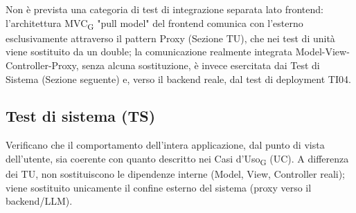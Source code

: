 Non è prevista una categoria di test di integrazione separata lato frontend: l'architettura MVC\textsubscript{G} "pull model" del frontend comunica con l'esterno esclusivamente attraverso il pattern Proxy (Sezione TU), che nei test di unità viene sostituito da un double; la comunicazione realmente integrata Model-View-Controller-Proxy, senza alcuna sostituzione, è invece esercitata dai Test di Sistema (Sezione seguente) e, verso il backend reale, dal test di deployment TI04.

\subsection{Test di sistema (TS)}
Verificano che il comportamento dell'intera applicazione, dal punto di vista dell'utente, sia coerente con quanto descritto nei Casi d'Uso\textsubscript{G} (UC). A differenza dei TU, non sostituiscono le dipendenze interne (Model, View, Controller reali); viene sostituito unicamente il confine esterno del sistema (proxy verso il backend/LLM).

